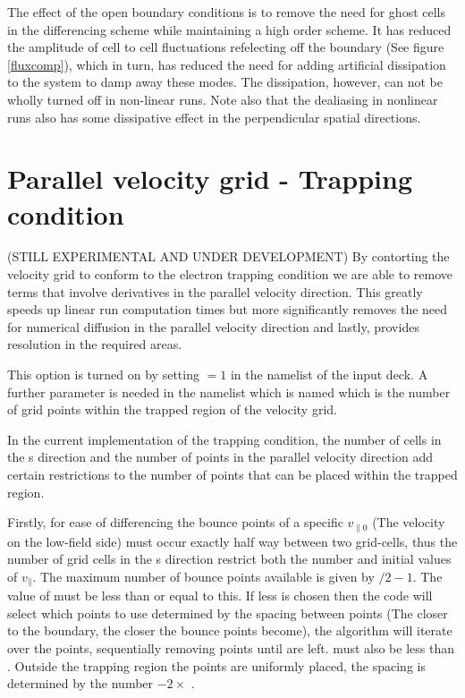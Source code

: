 \noindent


The effect of the open boundary conditions is to remove the need for ghost cells in the differencing scheme while maintaining a high order scheme. It has reduced the amplitude of cell to cell fluctuations refelecting off the boundary (See figure \ref{fluxcomp}), which in turn, has reduced the need for adding artificial dissipation to the system to damp away these modes.  The dissipation, however, can not be wholly turned off in non-linear runs.  Note also that the dealiasing in nonlinear runs also has some dissipative effect in the perpendicular spatial directions.

\section{Parallel velocity grid - Trapping condition} %
(STILL EXPERIMENTAL AND UNDER DEVELOPMENT)
By contorting the velocity grid to conform to the electron trapping condition we are able to remove terms that involve derivatives in the parallel velocity direction.  This greatly speeds up linear run computation times but more significantly removes the need for numerical diffusion in the parallel velocity direction and lastly, provides resolution in the required areas.

This option is turned on by setting  $= 1$ in the  namelist of the input deck.  A further parameter is needed in the  namelist which is named  which is the number of grid points within the trapped region of the velocity grid.

In the current implementation of the trapping condition, the number of cells in the s direction and the number of points in the parallel velocity direction add certain restrictions to the number of points that can be placed within the trapped region.

Firstly, for ease of differencing the bounce points of a specific $v_{\parallel 0}$ (The velocity on the low-field side) must occur exactly half way between two grid-cells, thus the number of grid cells in the s direction restrict both the number and initial values of $v_{\parallel}$.  The maximum number of bounce points available is given by $/2 - 1$.  The value of  must be less than or equal to this.  If less is chosen then the code will select which points to use determined by the spacing between points (The closer to the boundary, the closer the bounce points become), the algorithm will iterate over the points, sequentially removing points until  are left.   must also be less than .  Outside the trapping region the points are uniformly placed, the spacing is determined by the number  $- 2\times$ .

